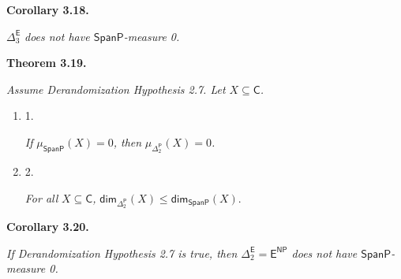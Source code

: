 \documentclass[10pt,a4paper]{article}
\begin{document}




\par\medskip\noindent\textbf{
\textbf{Corollary 3.18}\textbf{.}
}\par



$\Delta^{\mathsf{E}}_{3}$\emph{ does not have $\mathsf{SpanP}$-measure 0.}\par







\par\medskip\noindent\textbf{
\textbf{Theorem 3.19}\textbf{.}
}\par



\emph{Assume Derandomization Hypothesis 2.7.
Let $X\subseteq\mathsf{C}$.}\par


\begin{enumerate}


\item[] 
1. 


\emph{If }$\mu_{\mathsf{SpanP}}(X)=0$\emph{, then }$\mu_{\Delta^{\mathsf{P}}_{2}}(X)=0$\emph{.}\par





\item[] 
2. 


\emph{For all }$X\subseteq\mathsf{C}$\emph{,
}${\mathsf{dim}}_{\Delta^{\mathsf{P}}_{2}}(X)\leq{\mathsf{dim}}_{\mathsf{SpanP}}(X).$\emph{}\par





\end{enumerate}







\par\medskip\noindent\textbf{
\textbf{Corollary 3.20}\textbf{.}
}\par



\emph{If Derandomization Hypothesis 2.7 is true, then
$\Delta^{\mathsf{E}}_{2}=\mathsf{E}^{\mathsf{NP}}$ does not have $\mathsf{SpanP}$-measure 0.}\par
\end{document}
